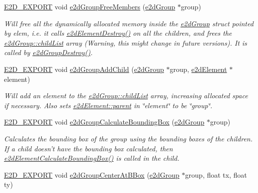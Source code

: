 \begin{DoxyCompactItemize}
\hyperlink{Ez2DS_8h_a9f14e9cb869e1a85fdaba03afcca0df9}{E2\-D\-\_\-\-E\-X\-P\-O\-R\-T} void \hyperlink{group__e2dGroup_gae28cbc879651049422f4045988398b6c}{e2d\-Group\-Free\-Members} (\hyperlink{structe2dGroup}{e2d\-Group} $\ast$group)
\begin{DoxyCompactList}\small\item\em Will free all the dynamically allocated memory inside the \hyperlink{structe2dGroup}{e2d\-Group} struct pointed by elem, i.\-e. it calls \hyperlink{group__e2dElement_ga2fdc3435e0e1ac9d1e1f0b330d9539fa}{e2d\-Element\-Destroy()} on all the children, and frees the \hyperlink{structe2dGroup_a55f6dde874716dc99dcd270fc0999a01}{e2d\-Group\-::child\-List} array (Warning, this might change in future versions). It is called by \hyperlink{group__e2dGroup_gae2d96b65c911168dd57442f75c632063}{e2d\-Group\-Destroy()}. \end{DoxyCompactList}\item 
\hyperlink{Ez2DS_8h_a9f14e9cb869e1a85fdaba03afcca0df9}{E2\-D\-\_\-\-E\-X\-P\-O\-R\-T} void \hyperlink{group__e2dGroup_ga364ad3636ddb85fafbd8817b4d6e2c1d}{e2d\-Group\-Add\-Child} (\hyperlink{structe2dGroup}{e2d\-Group} $\ast$group, \hyperlink{structe2dElement}{e2d\-Element} $\ast$element)
\begin{DoxyCompactList}\small\item\em Will add an element to the \hyperlink{structe2dGroup_a55f6dde874716dc99dcd270fc0999a01}{e2d\-Group\-::child\-List} array, increasing allocated space if necessary. Also sets \hyperlink{structe2dElement_a3e62eb2fbf1d6bc6d6fe549096a6cee9}{e2d\-Element\-::parent} in \char`\"{}element\char`\"{} to be \char`\"{}group\char`\"{}. \end{DoxyCompactList}\item 
\hyperlink{Ez2DS_8h_a9f14e9cb869e1a85fdaba03afcca0df9}{E2\-D\-\_\-\-E\-X\-P\-O\-R\-T} void \hyperlink{group__e2dGroup_gacf5659083b312e030456721b2560d4f4}{e2d\-Group\-Calculate\-Bounding\-Box} (\hyperlink{structe2dGroup}{e2d\-Group} $\ast$group)
\begin{DoxyCompactList}\small\item\em Calculates the bounding box of the group using the bounding boxes of the children. If a child doesn't have the bounding box calculated, then \hyperlink{group__e2dElement_ga575c7363927670f1ea8c52b7ea23fcd5}{e2d\-Element\-Calculate\-Bounding\-Box()} is called in the child. \end{DoxyCompactList}\item 
\hyperlink{Ez2DS_8h_a9f14e9cb869e1a85fdaba03afcca0df9}{E2\-D\-\_\-\-E\-X\-P\-O\-R\-T} void \hyperlink{group__e2dGroup_ga2800a7dc3827e8753e2f2c6ef2e05eb9}{e2d\-Group\-Center\-At\-B\-Box} (\hyperlink{structe2dGroup}{e2d\-Group} $\ast$group, float tx, float ty)

\end{DoxyCompactItemize}
